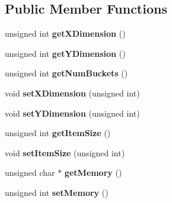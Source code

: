 \subsection*{\-Public \-Member \-Functions}
\begin{DoxyCompactItemize}
\item 
\hypertarget{classMemoryManager_a6ecf3b17cbec537ed29aa16a5bdafaa2}{unsigned int {\bfseries get\-X\-Dimension} ()}\label{classMemoryManager_a6ecf3b17cbec537ed29aa16a5bdafaa2}

\item 
\hypertarget{classMemoryManager_a1a0ae66dbf469ed771ef9b2807452baf}{unsigned int {\bfseries get\-Y\-Dimension} ()}\label{classMemoryManager_a1a0ae66dbf469ed771ef9b2807452baf}

\item 
\hypertarget{classMemoryManager_a8ed9694ea695f4533afb06fc595d371f}{unsigned int {\bfseries get\-Num\-Buckets} ()}\label{classMemoryManager_a8ed9694ea695f4533afb06fc595d371f}

\item 
\hypertarget{classMemoryManager_aff7e7c776b6f419319193a9bd2aae7d9}{void {\bfseries set\-X\-Dimension} (unsigned int)}\label{classMemoryManager_aff7e7c776b6f419319193a9bd2aae7d9}

\item 
\hypertarget{classMemoryManager_a49b487fdadf24be89ec5e2c23b100dd0}{void {\bfseries set\-Y\-Dimension} (unsigned int)}\label{classMemoryManager_a49b487fdadf24be89ec5e2c23b100dd0}

\item 
\hypertarget{classMemoryManager_a0a2a789513ac6d8349cfa536e2257330}{unsigned int {\bfseries get\-Item\-Size} ()}\label{classMemoryManager_a0a2a789513ac6d8349cfa536e2257330}

\item 
\hypertarget{classMemoryManager_adf8808f7cd5cabe38563bfffa1284174}{void {\bfseries set\-Item\-Size} (unsigned int)}\label{classMemoryManager_adf8808f7cd5cabe38563bfffa1284174}

\item 
\hypertarget{classMemoryManager_a914166c1616d285e59b1c409561c02e4}{unsigned char $\ast$ {\bfseries get\-Memory} ()}\label{classMemoryManager_a914166c1616d285e59b1c409561c02e4}

\item 
\hypertarget{classMemoryManager_a878d18b31d6cd9bd61a24a2b1ae853cf}{unsigned int {\bfseries set\-Memory} ()}\label{classMemoryManager_a878d18b31d6cd9bd61a24a2b1ae853cf}


\end{DoxyCompactItemize}
